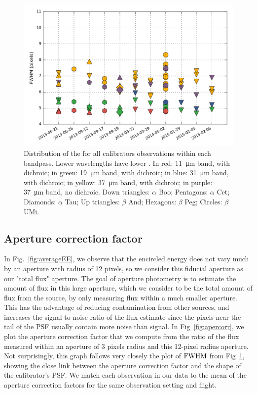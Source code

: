 \begin{figure}[!h]
\begin{center}
\includegraphics[width=\textwidth]{Figures/R50.png}
\vspace{-0.5cm}
\caption[PSF size of calibrators]{Distribution of the \Rfifty for all calibrators observations within each bandpass. Lower wavelengths have lower \Rfifty. In red: \SI{11}{\um} band, with dichroic; in green: \SI{19}{\um} band, with dichroic; in blue: \SI{31}{\um} band, with dichroic; in yellow: \SI{37}{\um} band, with dichroic; in purple: \SI{37}{\um} band, no dichroic. Down triangles: $\alpha$ Boo; Pentagons: $\alpha$ Cet; Diamonds: $\alpha$ Tau;  Up triangles: $\beta$ And; Hexagons: $\beta$ Peg; Circles: $\beta$ UMi.}
\label{fig:Rfiftydist}
\end{center}
\end{figure}

\subsection{Aperture correction factor}
\label{subsec:apcorr}
In Fig.~\ref{fig:averageEE}, we observe that the encircled energy does not vary much by an aperture with radius of 12 pixels, so we consider this fiducial aperture as our "total flux" aperture. The goal of aperture photometry is to estimate the amount of flux in this large aperture, which we consider to be the total amount of flux from the source, by only measuring flux within a much smaller aperture. This has the advantage of reducing contamination from other sources, and increases the signal-to-noise ratio of the flux estimate since the pixels near the tail of the PSF usually contain more noise than signal. 
In Fig~\ref{fig:apercorr}, we plot the aperture correction factor that we compute from the ratio of the flux measured within an aperture of 3 pixels radius and this 12-pixel radius aperture.  Not surprisingly, this graph follows very closely the plot of $\textrm{FWHM}$ from Fig~\ref{fig:Rfiftydist}, showing the close link between the aperture correction factor and the shape of the calibrator's PSF. We match each observation in our data to the mean of the aperture correction factors for the same observation setting and flight.

